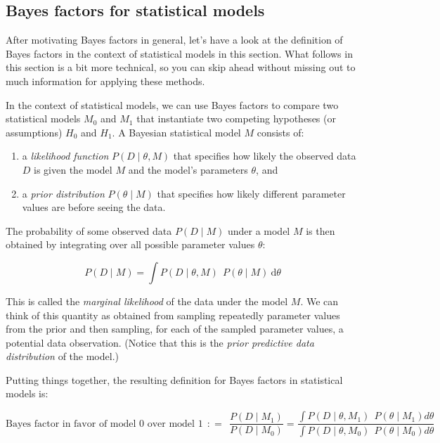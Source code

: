 \documentclass[
  doc,
  floatsintext,
  longtable,
  nolmodern,
  notxfonts,
  notimes,
  colorlinks=true,linkcolor=blue,citecolor=blue,urlcolor=blue]{apa7}
\providecommand{\tightlist}{%
  \setlength{\itemsep}{0pt}\setlength{\parskip}{0pt}}
\begin{document}
\subsection{Bayes factors for statistical
models}\label{bayes-factors-for-statistical-models}

After motivating Bayes factors in general, let's have a look at the
definition of Bayes factors in the context of statistical models in this
section. What follows in this section is a bit more technical, so you
can skip ahead without missing out to much information for applying
these methods.

In the context of statistical models, we can use Bayes factors to
compare two statistical models \(M_0\) and \(M_1\) that instantiate two
competing hypotheses (or assumptions) \(H_0\) and \(H_1\). A Bayesian
statistical model \(M\) consists of:

\begin{enumerate}
\def\labelenumi{\arabic{enumi}.}
\tightlist
\item
  a \emph{likelihood function} \(P(D \mid \theta, M)\) that specifies
  how likely the observed data \(D\) is given the model \(M\) and the
  model's parameters \(\theta\), and
\item
  a \emph{prior distribution} \(P(\theta \mid M)\) that specifies how
  likely different parameter values are before seeing the data.
\end{enumerate}

The probability of some observed data \(P(D \mid M)\) under a model
\(M\) is then obtained by integrating over all possible parameter values
\(\theta\):

\[
P(D \mid M) = \int P(D \mid \theta, M) \ \  P(\theta \mid M) \ \text{d} \theta
\]

This is called the \emph{marginal likelihood} of the data under the
model \(M\). We can think of this quantity as obtained from sampling
repeatedly parameter values from the prior and then sampling, for each
of the sampled parameter values, a potential data observation. (Notice
that this is the \emph{prior predictive data distribution} of the
model.)

Putting things together, the resulting definition for Bayes factors in
statistical models is:

\[
\text{Bayes factor in favor of model 0 over model 1} \ \  \colon\!= \ \ \frac{P(D \mid M_1)}{P(D \mid M_0)} = \frac{\int P(D \mid \theta, M_1) \ \  P(\theta \mid M_1) d\theta}{\int P(D \mid \theta, M_0) \ \  P(\theta \mid M_0) d\theta}
\]
\end{document}
